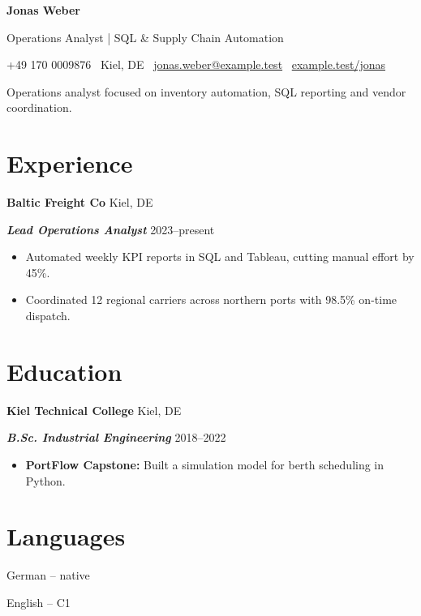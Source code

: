 \documentclass[10pt,a4paper]{article}
\newcommand{\RadiusProfileA}{Operations analyst focused on inventory automation, SQL reporting and vendor coordination.}
\newcommand{\RadiusWorkA}{Automated weekly KPI reports in SQL and Tableau, cutting manual effort by 45\%.}
\newcommand{\RadiusWorkB}{Coordinated 12 regional carriers across northern ports with 98.5\% on-time dispatch.}
\newcommand{\RadiusEduA}{\textbf{PortFlow Capstone:} Built a simulation model for berth scheduling in Python.}
\begin{document}
{\bfseries Jonas Weber}\par
Operations Analyst | SQL \& Supply Chain Automation\par
+49 170 0009876 \textbar\ Kiel, DE \textbar\ \href{mailto:jonas.weber@example.test}{jonas.weber@example.test} \textbar\ \href{https://example.test/jonas}{example.test/jonas}\par
\RadiusProfileA{}\par
\section*{Experience}
\textbf{Baltic Freight Co} \hfill Kiel, DE\par
\textbf{\textit{Lead Operations Analyst}} \hfill 2023--present\par
\begin{itemize}
\item \RadiusWorkA{}
\item \RadiusWorkB{}
\end{itemize}
\section*{Education}
\textbf{Kiel Technical College} \hfill Kiel, DE\par
\textbf{\textit{B.Sc. Industrial Engineering}} \hfill 2018--2022\par
\begin{itemize}
\item \RadiusEduA{}
\end{itemize}
\section*{Languages}
\noindent German – native\par
\noindent English – C1\par
\end{document}
